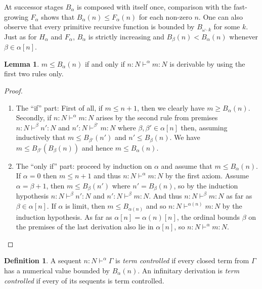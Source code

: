 \documentclass[8pt]{article}
\theoremstyle{definition}
\newtheorem{definition}{Definition}[section]
\theoremstyle{definition}
\theoremstyle{definition}
\theoremstyle{definition}
\theoremstyle{definition}
\theoremstyle{definition}
\theoremstyle{definition}
\theoremstyle{definition}
\newtheorem{lemma}{Lemma}[section]
\theoremstyle{definition}
\theoremstyle{definition}
\theoremstyle{definition}
\theoremstyle{definition}
\theoremstyle{definition}
\theoremstyle{question}
\begin{document}
At successor stages $B_{\alpha}$ is composed with itself once, comparison with the fast-growing 
$F_{\alpha}$ shows that $B_{\alpha}(n) \leq F_{\alpha}(n)$ for each non-zero $n$. One can also
observe that every primitive recursive function is bounded by $B_{\omega \cdot k}$ for some $k$.
Just as for $H_{\alpha}$ and $F_{\alpha}$, $B_{\alpha}$ is strictly increasing and 
$B_{\beta}(n) < B_{\alpha}(n)$ whenever $\beta \in \alpha[n]$.

\begin{lemma}
  $m \leq B_{\alpha}(n)$ if and only if $n : N \vdash^{\alpha} m : N$
  is derivable by using the first two rules only.
\end{lemma}

\begin{proof}
  $ $

  \begin{enumerate}
    \item The ``if'' part: First of all, if $m \leq n + 1$, then we clearly have $m \geq B_{\alpha}(n)$.
    Secondly, if $n : N \vdash^{\alpha} m : N$ arises by the second rule from premises $n : N \vdash^{\beta} n' : N$
    and $n' : N \vdash^{\beta'} m : N$ where $\beta, \beta' \in \alpha[n]$ then, assuming inductively
    that $m \leq B_{\beta'}(n')$ and $n' \leq B_{\beta}(n)$. We have $m \leq B_{\beta'}(B_{\beta}(n))$
    and hence $m \leq B_{\alpha}(n)$.
    \item The ``only if'' part: proceed by induction on $\alpha$ and assume that $m \leq B_{\alpha}(n)$.
    If $\alpha = 0$ then $m \leq n + 1$ and thus $n : N \vdash^{\alpha} m : N$ by the first axiom.
    Assume $\alpha = \beta + 1$, then $m \leq B_{\beta}(n')$ where $n' = B_{\beta}(n)$, so by the induction
    hypothesis $n : N \vdash^{\beta} n' : N$ and $n' : N \vdash^{\beta} m : N$. And thus 
    $n : N \vdash^{\beta} m : N$ as far as $\beta \in \alpha[n]$.
    If $\alpha$ is limit, then $m \leq B_{\alpha(n)}$ and so $n : N \vdash^{\alpha(n)} m : N$
    by the induction hypothesis. As far as $\alpha[n] = \alpha(n)[n]$, the ordinal bounds $\beta$
    on the premises of the last derivation also lie in $\alpha[n]$, so $n : N \vdash^{\alpha} m : N$.
  \end{enumerate}
\end{proof}

\begin{definition}
  A sequent $n : N \vdash^{\alpha} \Gamma$ is \emph{term controlled} if every closed
  term from $\Gamma$ has a numerical value bounded by $B_{\alpha}(n)$. An infinitary derivation is \emph{term controlled}
  if every of its sequents is term controlled.
\end{definition}
\end{document}
